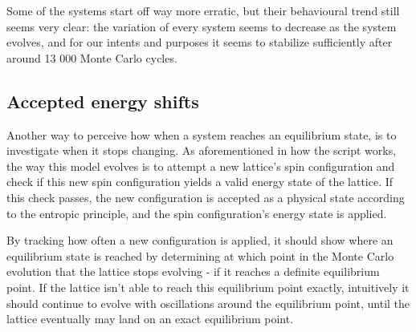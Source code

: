 \documentclass[11pt,a4paper,notitlepage,twocolumn]{article}
\begin{document}
Some of the systems start off way more erratic, but their behavioural trend still seems very clear: the variation of every system seems to decrease as the system evolves, and for our intents and purposes it seems to stabilize sufficiently after around 13 000 Monte Carlo cycles.

\subsection{Accepted energy shifts}
Another way to perceive how when a system reaches an equilibrium state, is to investigate when it stops changing. As aforementioned in how the script works, the way this model evolves is to attempt a new lattice's spin configuration and check if this new spin configuration yields a valid energy state of the lattice. If this check passes, the new configuration is accepted as a physical state according to the entropic principle, and the spin configuration's energy state is applied.

By tracking how often a new configuration is applied, it should show where an equilibrium state is reached by determining at which point in the Monte Carlo evolution that the lattice stops evolving - if it reaches a definite equilibrium point. If the lattice isn't able to reach this equilibrium point exactly, intuitively it should continue to evolve with oscillations around the equilibrium point, until the lattice eventually may land on an exact equilibrium point.
\end{document}
